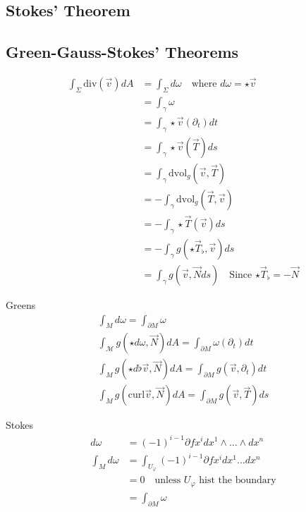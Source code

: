 \documentclass[10pt]{amsart}
\newcommand{\p}{\partial}
\newcommand{\dvol}{\text{dvol}_g}
\newcommand{\M}{\mathcal{M}}
\newcommand{\vp}{\varphi}
\renewcommand{\*}{\star}
\begin{document}
\subsection{Stokes' Theorem}%
\label{sub:stokes_theorem}

\subsection{Green-Gauss-Stokes' Theorems}%
\label{sub:green_gauss_stokes_theorems}

\begin{align*}
  \int_\Sigma \text{div}(\vec{v})dA&=\int_\Sigma d\omega\quad \text{where
  $d\omega=\*\vec{v}$}\\
                                   &=\int_\gamma\omega\\
                                   &=\int_\gamma\*\vec{v}(\p_t)dt\\
                                   &=\int_\gamma\*\vec{v}(\vec{T})ds\\
                                   &=\int_\gamma\dvol(\vec{v},\vec{T})\\
                                   &=-\int_\gamma\dvol(\vec{T}, \vec{v})\\
                                   &=-\int_\gamma\*\vec{T}(\vec{v})ds\\
                                   &=-\int_\gamma g(\*\vec{T}_\flat,
                                   \vec{v})ds\\
                                   &=\int_\gamma g(\vec{v},
                                   \vec{N}ds)\quad\text{Since
                                   $\*\vec{T}_\flat=-\vec{N}$}
\end{align*}

Greens
\begin{align*}
  \int_Md\omega=\int_{\p M}\omega\\
  \int_\M g(\* d\omega, \vec{N})dA=\int_{\p M}\omega(\p_t)dt\\
  \int_Mg(\* d\flat \vec{v},\vec{N})dA=\int_{\p M}g(\vec{v},\p_t)dt\\
  \int_Mg(\text{curl}\vec{v},\vec{N})dA=\int_{\p M}g(\vec{v},\vec{T})ds
\end{align*}

Stokes
\begin{align*}
  d\omega&=(-1)^{i-1}\p{f}{x^i}dx^1\wedge\ldots\wedge dx^n\\
  \int_M d\omega&=\int_{U_\vp}(-1)^{i-1}\p{f}{x^i}dx^1\ldots dx^n\\
                &=0\quad\text{unless $U_\vp$ hist the boundary}\\
                &=\int_{\p M}\omega
\end{align*}
\end{document}
